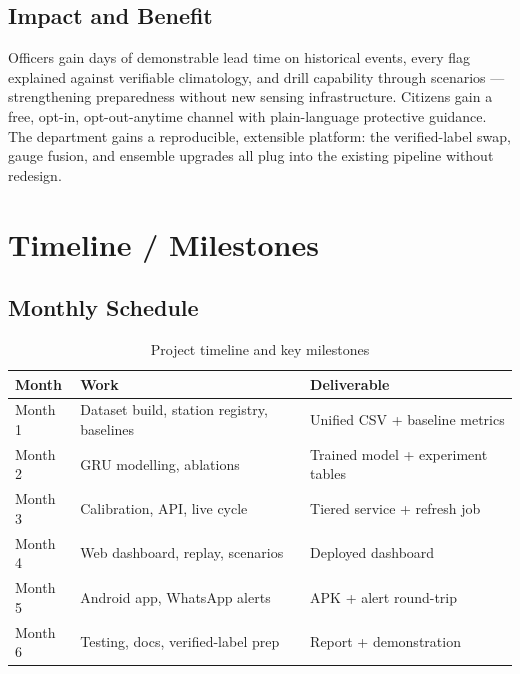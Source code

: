 \documentclass[a4paper,12pt]{report}
\begin{document}
\section{Impact and Benefit}
Officers gain days of demonstrable lead time on historical events, every flag explained against verifiable climatology, and drill capability through scenarios --- strengthening preparedness without new sensing infrastructure. Citizens gain a free, opt-in, opt-out-anytime channel with plain-language protective guidance. The department gains a reproducible, extensible platform: the verified-label swap, gauge fusion, and ensemble upgrades all plug into the existing pipeline without redesign.

\chapter{Timeline / Milestones}
\section{Monthly Schedule}
\begin{table}[H]
\centering
\renewcommand{\arraystretch}{1.3}
\begin{tabularx}{\textwidth}{|>{\raggedright\arraybackslash}p{2.6cm}|X|>{\raggedright\arraybackslash}p{4cm}|}
\hline
\textbf{Month} & \textbf{Work} & \textbf{Deliverable} \\ \hline
Month 1 & Dataset build, station registry, baselines & Unified CSV + baseline metrics \\ \hline
Month 2 & GRU modelling, ablations & Trained model + experiment tables \\ \hline
Month 3 & Calibration, API, live cycle & Tiered service + refresh job \\ \hline
Month 4 & Web dashboard, replay, scenarios & Deployed dashboard \\ \hline
Month 5 & Android app, WhatsApp alerts & APK + alert round-trip \\ \hline
Month 6 & Testing, docs, verified-label prep & Report + demonstration \\ \hline
\end{tabularx}
\caption{Project timeline and key milestones}
\label{tab:timeline}
\end{table}
\end{document}
